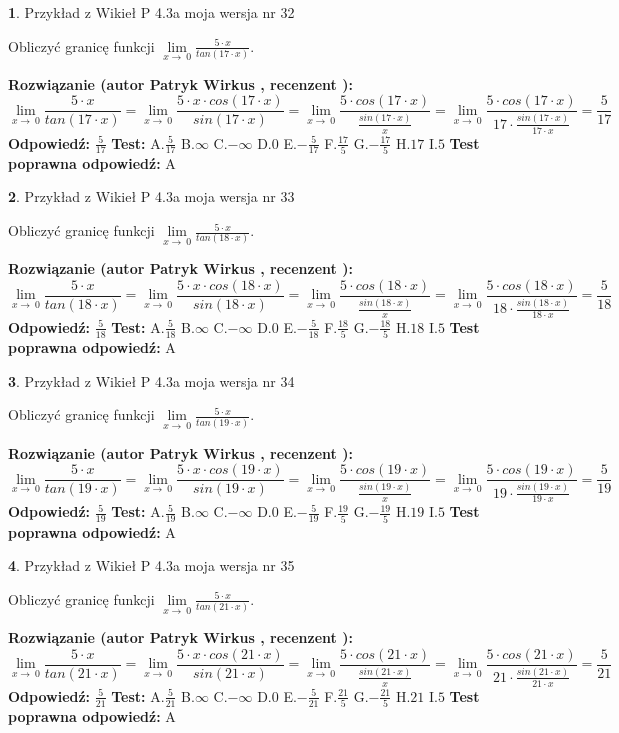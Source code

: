 \documentclass[12pt, a4paper]{article}
\theoremstyle{definition} %
\newtheorem{zad}{}
\newcommand{\zadStart}[1]{\begin{zad}#1\newline}
\newcommand{\zadStop}{\end{zad}}
\newcommand{\rozwStart}[2]{\noindent \textbf{Rozwiązanie (autor #1 , recenzent #2): }\newline}
\newcommand{\rozwStop}{\newline}
\newcommand{\odpStart}{\noindent \textbf{Odpowiedź:}\newline}
\newcommand{\odpStop}{\newline}
\newcommand{\testStart}{\noindent \textbf{Test:}\newline}
\newcommand{\testStop}{\newline}
\newcommand{\kluczStart}{\noindent \textbf{Test poprawna odpowiedź:}\newline}
\newcommand{\kluczStop}{\newline}
\begin{document}
\zadStart{Przykład z Wikieł P 4.3a moja wersja nr 32}


Obliczyć granicę funkcji $\lim\limits_{x\to\ 0}\frac{5 \cdot x}{tan(17 \cdot x)}$.
\zadStop
\rozwStart{Patryk Wirkus}{}
$$\lim\limits_{x\to\ 0}\frac{5 \cdot x}{tan(17 \cdot x)}=\lim\limits_{x\to\ 0}\frac{5 \cdot x \cdot cos(17 \cdot x)}{sin(17 \cdot x)}=\lim\limits_{x\to\ 0}\frac{5 \cdot cos(17 \cdot x)}{\frac{sin(17 \cdot x)}{x}}=\lim\limits_{x\to\ 0}\frac{5 \cdot cos(17 \cdot x)}{17 \cdot \frac{sin(17 \cdot x)}{17 \cdot x}} = \frac{5}{17}$$
\rozwStop
\odpStart
$\frac{5}{17}$
\odpStop
\testStart
A.$\frac{5}{17}$
B.$\infty$
C.$-\infty$
D.$0$
E.$-\frac{5}{17}$
F.$\frac{17}{5}$
G.$-\frac{17}{5}$
H.$17$
I.$5$
\testStop
\kluczStart
A
\kluczStop



\zadStart{Przykład z Wikieł P 4.3a moja wersja nr 33}


Obliczyć granicę funkcji $\lim\limits_{x\to\ 0}\frac{5 \cdot x}{tan(18 \cdot x)}$.
\zadStop
\rozwStart{Patryk Wirkus}{}
$$\lim\limits_{x\to\ 0}\frac{5 \cdot x}{tan(18 \cdot x)}=\lim\limits_{x\to\ 0}\frac{5 \cdot x \cdot cos(18 \cdot x)}{sin(18 \cdot x)}=\lim\limits_{x\to\ 0}\frac{5 \cdot cos(18 \cdot x)}{\frac{sin(18 \cdot x)}{x}}=\lim\limits_{x\to\ 0}\frac{5 \cdot cos(18 \cdot x)}{18 \cdot \frac{sin(18 \cdot x)}{18 \cdot x}} = \frac{5}{18}$$
\rozwStop
\odpStart
$\frac{5}{18}$
\odpStop
\testStart
A.$\frac{5}{18}$
B.$\infty$
C.$-\infty$
D.$0$
E.$-\frac{5}{18}$
F.$\frac{18}{5}$
G.$-\frac{18}{5}$
H.$18$
I.$5$
\testStop
\kluczStart
A
\kluczStop



\zadStart{Przykład z Wikieł P 4.3a moja wersja nr 34}


Obliczyć granicę funkcji $\lim\limits_{x\to\ 0}\frac{5 \cdot x}{tan(19 \cdot x)}$.
\zadStop
\rozwStart{Patryk Wirkus}{}
$$\lim\limits_{x\to\ 0}\frac{5 \cdot x}{tan(19 \cdot x)}=\lim\limits_{x\to\ 0}\frac{5 \cdot x \cdot cos(19 \cdot x)}{sin(19 \cdot x)}=\lim\limits_{x\to\ 0}\frac{5 \cdot cos(19 \cdot x)}{\frac{sin(19 \cdot x)}{x}}=\lim\limits_{x\to\ 0}\frac{5 \cdot cos(19 \cdot x)}{19 \cdot \frac{sin(19 \cdot x)}{19 \cdot x}} = \frac{5}{19}$$
\rozwStop
\odpStart
$\frac{5}{19}$
\odpStop
\testStart
A.$\frac{5}{19}$
B.$\infty$
C.$-\infty$
D.$0$
E.$-\frac{5}{19}$
F.$\frac{19}{5}$
G.$-\frac{19}{5}$
H.$19$
I.$5$
\testStop
\kluczStart
A
\kluczStop



\zadStart{Przykład z Wikieł P 4.3a moja wersja nr 35}


Obliczyć granicę funkcji $\lim\limits_{x\to\ 0}\frac{5 \cdot x}{tan(21 \cdot x)}$.
\zadStop
\rozwStart{Patryk Wirkus}{}
$$\lim\limits_{x\to\ 0}\frac{5 \cdot x}{tan(21 \cdot x)}=\lim\limits_{x\to\ 0}\frac{5 \cdot x \cdot cos(21 \cdot x)}{sin(21 \cdot x)}=\lim\limits_{x\to\ 0}\frac{5 \cdot cos(21 \cdot x)}{\frac{sin(21 \cdot x)}{x}}=\lim\limits_{x\to\ 0}\frac{5 \cdot cos(21 \cdot x)}{21 \cdot \frac{sin(21 \cdot x)}{21 \cdot x}} = \frac{5}{21}$$
\rozwStop
\odpStart
$\frac{5}{21}$
\odpStop
\testStart
A.$\frac{5}{21}$
B.$\infty$
C.$-\infty$
D.$0$
E.$-\frac{5}{21}$
F.$\frac{21}{5}$
G.$-\frac{21}{5}$
H.$21$
I.$5$
\testStop
\kluczStart
A
\kluczStop
\end{document}
